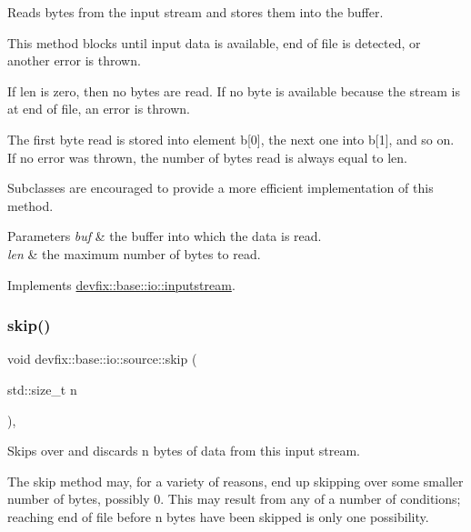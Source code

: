 Reads bytes from the input stream and stores them into the buffer. 

This method blocks until input data is available, end of file is detected, or another error is thrown.

If len is zero, then no bytes are read. If no byte is available because the stream is at end of file, an error is thrown.

The first byte read is stored into element b\mbox{[}0\mbox{]}, the next one into b\mbox{[}1\mbox{]}, and so on. If no error was thrown, the number of bytes read is always equal to len.

Subclasses are encouraged to provide a more efficient implementation of this method.


\begin{DoxyParams}{Parameters}
{\em buf} & the buffer into which the data is read. \\
\hline
{\em len} & the maximum number of bytes to read. \\
\hline
\end{DoxyParams}


Implements \hyperlink{structdevfix_1_1base_1_1io_1_1inputstream_a17e1a21881ae263650ebdaafaee2e71a}{devfix\+::base\+::io\+::inputstream}.

\mbox{\label{structdevfix_1_1base_1_1io_1_1source_a21cb579307589cbc6f9e02d64c66f4b2}} 
\subsubsection{\texorpdfstring{skip()}{skip()}}
{\footnotesize\ttfamily void devfix\+::base\+::io\+::source\+::skip (\begin{DoxyParamCaption}\item[{std\+::size\+\_\+t}]{n }\end{DoxyParamCaption})\hspace{0.3cm}{\ttfamily [override]}, {\ttfamily [virtual]}}



Skips over and discards n bytes of data from this input stream. 

The skip method may, for a variety of reasons, end up skipping over some smaller number of bytes, possibly 0. This may result from any of a number of conditions; reaching end of file before n bytes have been skipped is only one possibility.



